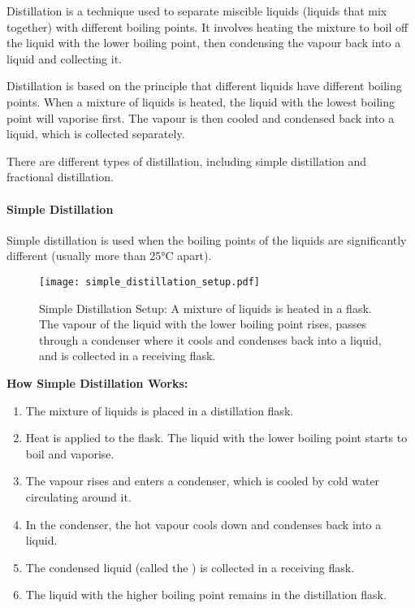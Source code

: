 \begin{keyconcept}{Distillation}
 is a technique used to separate miscible liquids (liquids that mix together) with different boiling points. It involves heating the mixture to boil off the liquid with the lower boiling point, then condensing the vapour back into a liquid and collecting it.
\end{keyconcept}

Distillation is based on the principle that different liquids have different boiling points. When a mixture of liquids is heated, the liquid with the lowest boiling point will vaporise first. The vapour is then cooled and condensed back into a liquid, which is collected separately.


There are different types of distillation, including simple distillation and fractional distillation.

\paragraph{Simple Distillation}

Simple distillation is used when the boiling points of the liquids are significantly different (usually more than 25°C apart).

\begin{figure}
\centering
\texttt{[image: simple\_distillation\_setup.pdf]}
\caption{Simple Distillation Setup: A mixture of liquids is heated in a flask. The vapour of the liquid with the lower boiling point rises, passes through a condenser where it cools and condenses back into a liquid, and is collected in a receiving flask.}
\end{figure}

\textbf{How Simple Distillation Works:}
\begin{enumerate}
    \item The mixture of liquids is placed in a distillation flask.
    \item Heat is applied to the flask. The liquid with the lower boiling point starts to boil and vaporise.
    \item The vapour rises and enters a condenser, which is cooled by cold water circulating around it.
    \item In the condenser, the hot vapour cools down and condenses back into a liquid.
    \item The condensed liquid (called the ) is collected in a receiving flask.
    \item The liquid with the higher boiling point remains in the distillation flask.
\end{enumerate}


